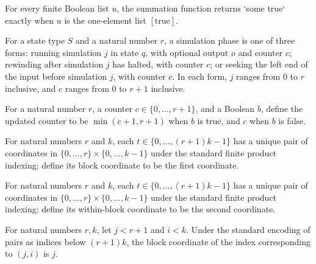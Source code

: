 \begin{theorem}
\label{Randomized.Amplify.summ_eq_some_true}
\leanok
{}
For every finite Boolean list $u$, the summation function returns `some true` exactly
when $u$ is the one-element list $[\mathrm{true}]$.
\end{theorem}

\begin{definition}
\label{Randomized.Amplify.Phase}
\leanok
For a state type $S$ and a natural number $r$, a simulation phase is one of three forms:
running simulation $j$ in state $q$, with optional output $o$ and counter $c$; rewinding
after simulation $j$ has halted, with counter $c$; or seeking the left end of the input
before simulation $j$, with counter $c$. In each form, $j$ ranges from $0$ to $r$
inclusive, and $c$ ranges from $0$ to $r+1$ inclusive.
\end{definition}

\begin{definition}
\label{Randomized.Amplify.bump}
\leanok
For a natural number $r$, a counter $c\in\{0,\ldots,r+1\}$, and a Boolean $b$, define
the updated counter to be $\min(c+1,r+1)$ when $b$ is true, and $c$ when $b$ is false.
\end{definition}

\begin{definition}
\label{Randomized.Amplify.blk}
\leanok
For natural numbers $r$ and $k$, each $t\in\{0,\ldots,(r+1)k-1\}$ has a unique pair of
coordinates in $\{0,\ldots,r\}\times\{0,\ldots,k-1\}$ under the standard finite product
indexing; define its block coordinate to be the first coordinate.
\end{definition}

\begin{definition}
\label{Randomized.Amplify.idx}
\leanok
For natural numbers $r$ and $k$, each $t\in\{0,\ldots,(r+1)k-1\}$ has a unique pair of
coordinates in $\{0,\ldots,r\}\times\{0,\ldots,k-1\}$ under the standard finite product
indexing; define its within-block coordinate to be the second coordinate.
\end{definition}

\begin{theorem}
\label{Randomized.Amplify.blk_mk}
\leanok
{}
For natural numbers $r,k$, let $j<r+1$ and $i<k$. Under the standard encoding of pairs
as indices below $(r+1)k$, the block coordinate of the index corresponding to $(j,i)$ is
$j$.
\end{theorem}

